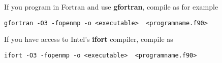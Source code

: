 \documentclass[%
oneside,                 %
final,                   %
10pt]{article}
\begin{document}
If you program in Fortran and use \textbf{gfortran}, compile as for example
\begin{verbatim}
gfortran -O3 -fopenmp -o <executable>  <programname.f90>
\end{verbatim}
If you have access to Intel's \textbf{ifort} compiler, compile as 
\begin{verbatim}
ifort -O3 -fopenmp -o <executable>  <programname.f90>
\end{verbatim}










\end{document}
